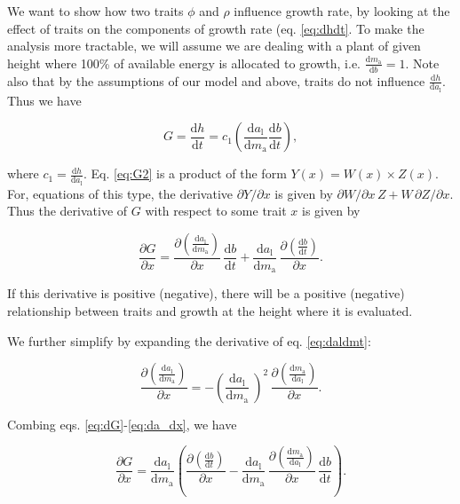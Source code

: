 \documentclass[12pt, a4paper]{article}
\begin{document}
\begin{appendices}
We want to show how two traits $\phi$ and $\rho$ influence growth rate,
by looking at the effect of
traits on the components of growth rate (eq. \ref{eq:dhdt}. To make
the analysis more tractable, we will assume we are dealing with a plant of
given height where 100\% of available energy is allocated to growth,
i.e. $\frac{\textrm{d}m_\textrm{a}}{\textrm{d}b}=1$. Note also
that by the assumptions of our model and above, traits do not influence
$\frac{\textrm{d}h} {\textrm{d}a_\textrm{l}}$. Thus we have

\begin{equation} \label{eq:G2}
G = \frac{\textrm{d}h}{\textrm{d}t} = c_1   \left(\frac{\textrm{d}a_\textrm{l}} {\textrm{d}m_\textrm{a}}  \frac{ \textrm{d}b} {\textrm{d}t} \right),
\end{equation}

where $c_1 = \frac{\textrm{d}h}{\textrm{d}a_\textrm{l}}$. Eq.
\ref{eq:G2} is a product of the form $Y(x) = W(x) \times Z(x)$. For,
equations of this type, the derivative $\partial{Y}/\partial{x}$ is
given by $\partial{W}/\partial{x} \, Z + W \, \partial{Z}/\partial{x}$. Thus
the derivative of $G$ with respect to some trait $x$  is given by

\begin{equation} \label{eq:dG}
\frac{\partial G} {\partial x} =
\frac{\partial \left(\frac{\textrm{d}a_\textrm{l}} {\textrm{d}m_\textrm{a}}\right)}{\partial x}
 \, \frac{ \textrm{d}b} {\textrm{d}t}
+ \frac{\textrm{d}a_\textrm{l}} {\textrm{d}m_\textrm{a}}
\, \frac{\partial \left( \frac{ \textrm{d}b} {\textrm{d}t}\right)}{\partial x}.
\end{equation}

If this derivative is positive (negative), there will be a positive (negative) relationship
between traits and growth at the height where it is evaluated.

We further simplify by expanding the derivative of eq. \ref{eq:daldmt}:

\begin{equation} \label{eq:da_dx}
\frac{\partial \left(\frac{\textrm{d}a_\textrm{l}} {\textrm{d}m_\textrm{a}}\right)}
{\partial x} = -\left(\frac{\textrm{d}a_\textrm{l}} {\textrm{d}m_\textrm{a}}\ \right)^2
\, \frac{\partial \left(\frac{\textrm{d}m_\textrm{a}} {\textrm{d}a_\textrm{l}}\right)
}{\partial x}.
\end{equation}

Combing eqs. \ref{eq:dG}-\ref{eq:da_dx}, we have

\begin{equation} \label{eq:dG2}
\frac{\partial G} {\partial x} =
\frac{\textrm{d}a_\textrm{l}} {\textrm{d}m_\textrm{a}}
\left(
\frac{\partial \left( \frac{ \textrm{d}b} {\textrm{d}t}\right)}{\partial x}
- \frac{\textrm{d}a_\textrm{l}} {\textrm{d}m_\textrm{a}}
\,  \frac{\partial \left(\frac{\textrm{d}m_\textrm{a}} {\textrm{d}a_\textrm{l}}\right)
}{\partial x}
 \, \frac{ \textrm{d}b} {\textrm{d}t}
\right).
\end{equation}


\end{appendices}
\end{document}
